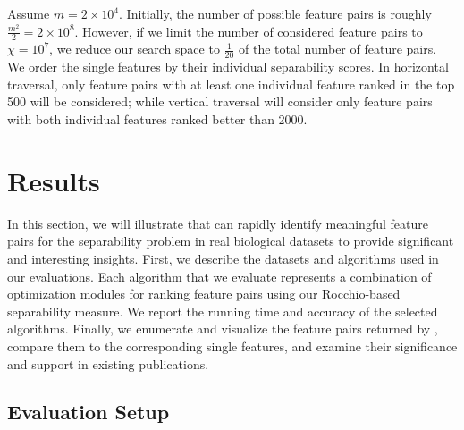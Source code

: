 \begin{example}[\traversal]
Assume $m=2\times 10^4$. Initially, the number of possible feature pairs is roughly $\frac{m^2}{2}=2\times 10^8$. However, if we limit the number of considered feature pairs to $\chi=10^7$, we reduce our search space to $\frac{1}{20}$ of the total number of feature pairs. We order the single features by their individual separability scores. In horizontal traversal, only feature pairs with at least one individual feature ranked in the top 500 will be considered; while vertical traversal will consider only feature pairs with both individual features ranked better than 2000.
\end{example}


\section{Results}
\label{sec:exp}
In this section, we will illustrate that \genviz can rapidly identify meaningful feature pairs for the separability problem in real biological datasets to provide significant and interesting insights. First, we describe the datasets and algorithms used in our evaluations. Each algorithm that we evaluate represents a combination of optimization modules for ranking \topk feature pairs using our Rocchio-based separability measure. We report the running time and accuracy of the selected algorithms. Finally, we enumerate and visualize the \topk feature pairs returned by \genviz, compare them to the corresponding \topk single features, and examine their significance and support in existing publications.

\subsection{Evaluation Setup}


